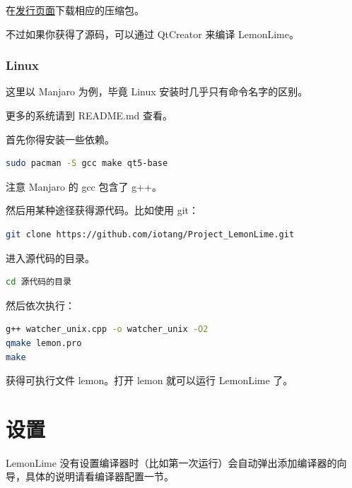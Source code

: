 \documentclass[UTF-8]{ctexart}
\begin{document}
				在\href{https://github.com/iotang/Project_LemonLime/releases}{发行页面}下载相应的压缩包。
				
				不过如果你获得了源码，可以通过 QtCreator 来编译 LemonLime。
			
			\subsubsection{Linux}
			
				这里以 Manjaro 为例，毕竟 Linux 安装时几乎只有命令名字的区别。
				
				更多的系统请到 README.md 查看。
				
				首先你得安装一些依赖。
				
				\begin{lstlisting}[language=bash,frame=shadowbox,basicstyle=\ttfamily]
sudo pacman -S gcc make qt5-base
				\end{lstlisting}
				
				注意 Manjaro 的 gcc 包含了 g++。
				
				然后用某种途径获得源代码。比如使用 git：
				
				\begin{lstlisting}[language=bash,frame=shadowbox,basicstyle=\ttfamily]
git clone https://github.com/iotang/Project_LemonLime.git
				\end{lstlisting}
				
				进入源代码的目录。
				
				\begin{lstlisting}[language=bash,frame=shadowbox,basicstyle=\ttfamily]
cd 源代码的目录
				\end{lstlisting}
				
				然后依次执行：
				
				\begin{lstlisting}[language=bash,frame=shadowbox,basicstyle=\ttfamily]
g++ watcher_unix.cpp -o watcher_unix -O2
qmake lemon.pro
make
				\end{lstlisting}
				
				获得可执行文件 lemon。打开 lemon 就可以运行 LemonLime 了。
			
		\newpage
		
		\section{设置}
		
			LemonLime 没有设置编译器时（比如第一次运行）会自动弹出添加编译器的向导，具体的说明请看编译器配置一节。
		
\end{document}
